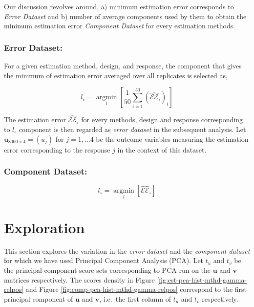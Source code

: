 \documentclass[12pt,3p,authoryear]{elsarticle}
\begin{document}
Our discussion revolves around, a) minimum estimation error corresponds
to \emph{Error Dataset} and b) number of average components used by them
to obtain the minimum estimation error \emph{Component Dataset} for
every estimation methods.

\subsubsection{Error Dataset:}\label{error-dataset}

For a given estimation method, design, and response, the component that
gives the minimum of estimation error averaged over all replicates is
selected as,

\begin{equation}
  l_\circ = \operatorname*{argmin}_{l}\left[\frac{1}{50}\sum_{i=1}^{50}{\left(\widehat{\mathcal{EE}}_\circ\right)_{i}}\right]
\end{equation}

The estimation error \(\widehat{\mathcal{EE}}_\circ\) for every methods,
design and response corresponding to \(l_\circ\) component is then
regarded as \emph{error dataset} in the subsequent analysis. Let
\(\mathbf{u}_{8000\times4}=(u_j)\) for \(j = 1, \ldots 4\) be the
outcome variables measuring the estimation error corresponding to the
response \(j\) in the context of this dataset.

\subsubsection{Component Dataset:}\label{component-dataset}

\begin{equation}
  l_{\circ} = \operatorname*{argmin}_{l}\left[\widehat{\mathcal{EE}}_{\circ}\right]
\end{equation}

\hypertarget{exploration}{\section{Exploration}\label{exploration}}

This section explores the variation in the \emph{error dataset} and the
\emph{component dataset} for which we have used Principal Component
Analysis (PCA). Let \(t_u\) and \(t_v\) be the principal component score
sets corresponding to PCA run on the \(\mathbf{u}\) and \(\mathbf{v}\)
matrices respectively. The scores density in Figure
\ref{fig:est-pca-hist-mthd-gamma-relpos} and Figure
\ref{fig:comp-pca-hist-mthd-gamma-relpos} correspond to the first
principal component of \(\mathbf{u}\) and \(\mathbf{v}\), i.e.~the first
column of \(t_u\) and \(t_v\) respectively.
\end{document}
